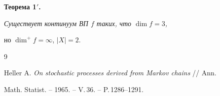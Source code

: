 {\bf Теорема 1${}'$.} {\it Существует континуум ВП $f$ таких, что $\dim f=3$,


но $\dim^+f=\infty$, $|X|=2$.}





\begin{thebibliography}{9}







Heller A. {\em On stochastic processes derived from Markov chains} // Ann.


Math. Statist. -- 1965. -- V.\,36. -- P.\,1286--1291.





\end{thebibliography}





\vskip 2cm









\smallskip









\label{end}





